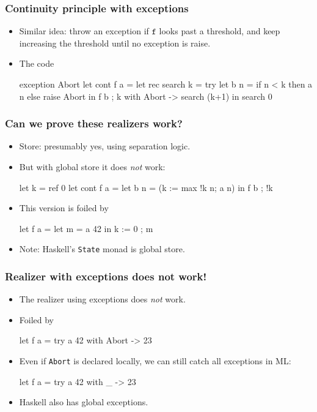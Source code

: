 \documentclass[t]{beamer}
\begin{document}
\begin{frame}[fragile]
  \frametitle{Continuity principle with exceptions}


  \begin{itemize}
  \item Similar idea: throw an exception if $\mathtt{f}$ looks past a
    threshold, and keep increasing the threshold until no exception is
    raise.
  \item The code
\begin{source}
exception Abort
let cont f a =
  let rec search k =
    try
      let b n = 
        if n < k then a n else raise Abort
      in
        f b ; k
    with Abort -> search (k+1)
  in
    search 0
\end{source}
  \end{itemize}
\end{frame}

\begin{frame}[fragile]
  \frametitle{Can we prove these realizers work?}

  \begin{itemize}
  \item Store: presumably yes, using separation logic.
  \item But with global store it does \emph{not} work:

\begin{source}
let k = ref 0
let cont f a =
  let b n = (k := max !k n; a n) in
    f b ; !k
\end{source}

\item 
This version is foiled by

\begin{source}
let f a =
  let m = a 42 in k := 0 ; m
\end{source}
\item Note: Haskell's \texttt{State} monad is global store.
\end{itemize}
\end{frame}

\begin{frame}[fragile]
  \frametitle{Realizer with exceptions does not work!}

  \begin{itemize}
  \item 
    The realizer using exceptions does \emph{not} work.
  \item Foiled by

\begin{source}
let f a =
  try a 42 with Abort -> 23
\end{source}

\item 
Even if \texttt{Abort} is declared locally, we can still catch all
exceptions in ML:
  
\begin{source}
let f a =
  try a 42 with _ -> 23
\end{source}
\item Haskell also has global exceptions.

  \end{itemize}

\end{frame}
\end{document}
